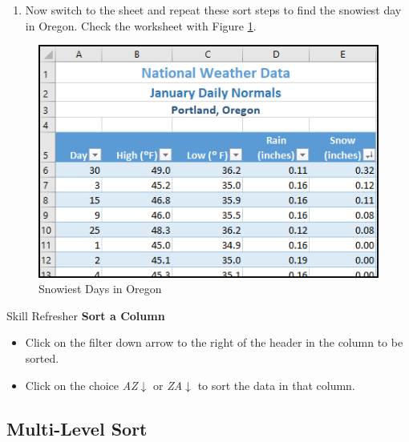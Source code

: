 \begin{enumbox}
	\begin{enumerate}
		\item Now switch to the  sheet and repeat these sort steps to find the snowiest day in Oregon. Check the worksheet with Figure \ref{05:fig10}.
	\end{enumerate}
\end{enumbox}
	
\begin{figure}[H]
	\centering
	\includegraphics[width=\maxwidth{.95\linewidth}]{gfx/ch05_fig10}
	\caption{Snowiest Days in Oregon}
	\label{05:fig10}
\end{figure}

\begin{center}
	\begin{sklbox}{Skill Refresher}
		\textbf{Sort a Column}
		\\
		\begin{itemize}
			\setlength{\itemsep}{0pt}
			\setlength{\parskip}{0pt}
			\setlength{\parsep}{0pt}

			\item Click on the filter down arrow to the right of the header in the column to be sorted.
			\item Click on the choice \textit{AZ}$ \downarrow $ or \textit{ZA}$ \downarrow $ to sort the data in that column.
						
		\end{itemize}
	\end{sklbox}
\end{center}

\subsection{Multi-Level Sort}


